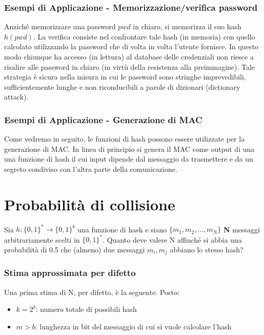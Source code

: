 \subsubsection{Esempi di Applicazione - Memorizzazione/verifica password}
Anziché memorizzare una password $pwd$ in chiaro, si memorizza il suo hash $h(pwd)$. La verifica consiste nel confrontare tale hash (in memoria) con quello calcolato utilizzando la password che di volta in volta l'utente fornisce. In questo modo chiunque ha accesso (in lettura) al database delle credenziali non riesce a risalire alle password in chiaro (in virtù della resistenza alla preimmagine). Tale strategia è sicura nella misura in cui le password sono stringhe imprevedibili, sufficientemente lunghe e non riconducibili a parole di dizionari (dictionary attack).

\subsubsection{Esempi di Applicazione - Generazione di MAC}
Come vedremo in seguito, le funzioni di hash possono essere utilizzate per la generazione di MAC. In linea di principio si genera il MAC come output di una una funzione di hash il cui input dipende dal messaggio da trasmettere e da un segreto condiviso con l'altra parte della comunicazione.

\section{Probabilità di collisione}
Sia $h:\{0, 1\}^{*} \rightarrow \{0, 1\}^{b}$ una funzione di hash e siano $\{m_{1}, m_{2}, ..., m_{N}\}$ \textbf{N} messaggi arbitrariamente scelti in $\{0, 1\}^{*}$. Quanto deve valere N affinché si abbia una probabilità di 0.5 che (almeno) due messaggi $m_{i}, m_{j}$ abbiano lo stesso hash?

\subsubsection{Stima approssimata per difetto} \label{par:stima_difetto}

Una prima stima di N, per difetto, è la seguente. Posto:
\begin{itemize}
	\item $k = 2^{b}$: numero totale di possibili hash
	\item $m>b$: lunghezza in bit del messaggio di cui si vuole calcolare l'hash
\end{itemize}
 
